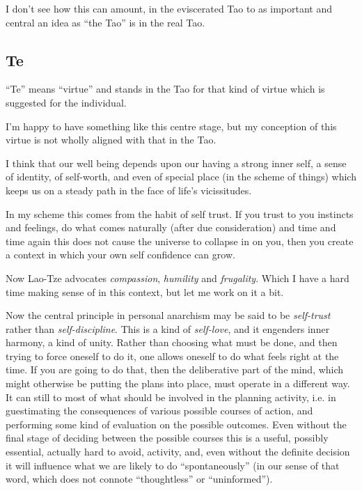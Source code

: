 \documentclass[numreferences]{rbjk}
\begin{document}
\begin{article}
I don't see how this can amount, in the eviscerated Tao to as important and central an idea as ``the Tao'' is in the real Tao.

\subsection{Te}

``Te'' means ``virtue'' and stands in the Tao for that kind of virtue which is suggested for the individual.

I'm happy to have something like this centre stage, but my conception of this virtue is not wholly aligned with that in the Tao.

I think that our well being depends upon our having a strong inner self, a sense of identity, of self-worth, and even of special place (in the scheme of things) which keeps us on a steady path in the  face of life's vicissitudes.

In my scheme this comes from the habit of self trust.
If you trust to you instincts and feelings, do what comes naturally (after due consideration) and time and time again this does not cause the universe to collapse in on you, then you create a context in which your own self confidence can grow.

Now Lao-Tze advocates {\it compassion}, {\it humility} and {\it frugality}.
Which I have a hard time making sense of in this context, but let me work on it a bit.

Now the central principle in personal anarchism may be said to be {\it self-trust} rather than {\it self-discipline}.
This is a kind of {\it self-love}, and it engenders inner harmony, a kind of unity.
Rather than choosing what must be done, and then trying to force oneself to do it, one allows oneself to do what feels right at the time.
If you are going to do that, then the deliberative part of the mind, which might otherwise be putting the plans into place, must operate in a different way.
It can still to most of what should be involved in the planning activity, i.e. in guestimating the consequences of various possible courses of action, and performing some kind of evaluation on the possible outcomes.
Even without the final stage of deciding between the possible courses this is a useful, possibly essential, actually hard to avoid, activity, and, even without the definite decision it will influence what we are likely to do ``spontaneously'' (in our sense of that word, which does not connote ``thoughtless'' or ``uninformed'').


\end{article}
\end{document}
